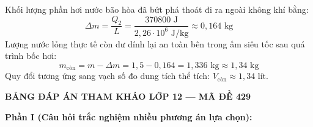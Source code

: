 \begin{ex}
{\begin{enumerate}
			Khối lượng phần hơi nước bão hòa đã bứt phá thoát đi ra ngoài không khí bằng:
			$$\Delta m = \frac{Q_2}{L} = \frac{370800\text{ J}}{2,26 \cdot 10^6\text{ J/kg}} \approx 0,164\text{ kg}$$
			Lượng nước lỏng thực tế còn dư dính lại an toàn bên trong ấm siêu tốc sau quá trình bốc hơi:
			$$m_{\text{còn}} = m - \Delta m = 1,5 - 0,164 = 1,336\text{ kg} \approx 1,34\text{ kg}$$
			Quy đổi tương ứng sang vạch số đo dung tích thể tích: $V_{\text{còn}} \approx 1,34\text{ lít}$.
		\end{enumerate}
	}
\end{ex}


\newpage
\begin{center} \textbf{BẢNG ĐÁP ÁN THAM KHẢO LỚP 12 --- MÃ ĐỀ 429} \end{center}

\noindent \textbf{Phần I (Câu hỏi trắc nghiệm nhiều phương án lựa chọn):}